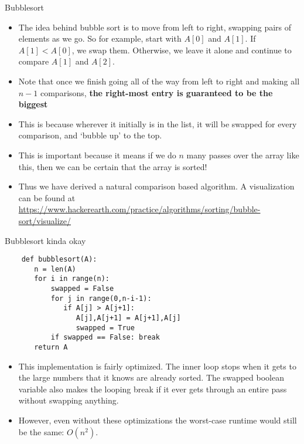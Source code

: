 \documentclass{beamer}
\begin{document}
\begin{frame}{Bubblesort}
    \begin{itemize}
        \item The idea behind bubble sort is to move from left to right, swapping pairs of elements as we go. So for example, start with $A[0]$ and $A[1]$. If $A[1] < A[0]$, we swap them. Otherwise, we leave it alone and continue to compare $A[1]$ and $A[2]$. 
        \pause 
        \item Note that once we finish going all of the way from left to right and making all $n-1$ comparisons, \textbf{the right-most entry is guaranteed to be the biggest}
        \pause 
        \item This is because wherever it initially is in the list, it will be swapped for every comparison, and `bubble up' to the top. 
        \pause 
        \item This is important because it means if we do $n$ many passes over the array like this, then we can be certain that the array is sorted!
        \item Thus we have derived a natural comparison based algorithm. A visualization can be found at \url{https://www.hackerearth.com/practice/algorithms/sorting/bubble-sort/visualize/}
    \end{itemize}
\end{frame}

\begin{frame}[fragile]{Bubblesort kinda okay}
    \begin{verbatim}
    def bubblesort(A):
       n = len(A)
	   for i in range(n):
		   swapped = False
		   for j in range(0,n-i-1):
		      if A[j] > A[j+1]:
		         A[j],A[j+1] = A[j+1],A[j]
			     swapped = True
		   if swapped == False: break
	   return A
    \end{verbatim}
    \begin{itemize}
        \item This implementation is fairly optimized. The inner loop stops when it gets to the large numbers that it knows are already sorted. The swapped boolean variable also makes the looping break if it ever gets through an entire pass without swapping anything.
        \pause 
        \item However, even without these optimizations the worst-case runtime would still be the same: $O(n^2)$. 
    \end{itemize}
\end{frame}
\end{document}
